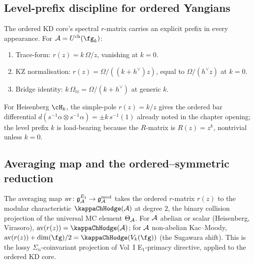 \subsection{Level-prefix discipline for ordered Yangians}
\label{subsec:ordered-kd-core-rmatrix-level-prefix}

\begin{remark}
\label{rem:ordered-kd-core-rmatrix-level-prefix}
The ordered KD core's spectral $r$-matrix carries an explicit
prefix in every appearance. For $\cA = U^{\mathrm{ch}}(\fg_k)$:
\begin{enumerate}[label=\textup{(\roman*)}]
\item Trace-form: $r(z) = k\,\Omega/z$, vanishing at $k=0$.
\item KZ normalisation: $r(z) = \Omega/((k+h^\vee)z)$, equal to
$\Omega/(h^\vee z)$ at $k=0$.
\item Bridge identity: $k\,\Omega_{\mathrm{tr}} = \Omega/(k+h^\vee)$
at generic $k$.
\end{enumerate}
For Heisenberg $\cH_k$, the simple-pole $r(z) = k/z$ gives the
ordered bar differential
$d(s^{-1}\alpha\otimes s^{-1}\alpha) = \pm k\, s^{-1}(1)$
already noted in the chapter opening; the level prefix $k$ is
load-bearing because the $R$-matrix is $R(z) = z^k$, nontrivial
unless $k=0$.
\end{remark}

\subsection{Averaging map and the ordered--symmetric reduction}
\label{subsec:ordered-kd-core-averaging}

\begin{proposition}
\label{prop:ordered-kd-core-averaging-modular}
The averaging map
$\mathrm{av}\colon \mathfrak{g}^{E_1}_{\mathcal{A}} \to
\mathfrak{g}^{\mathrm{mod}}_{\mathcal{A}}$ takes the ordered $r$-matrix
$r(z)$ to the modular characteristic $\kappaChHodge(\cA)$ at degree $2$,
the binary collision projection of the universal MC element
$\Theta_{\mathcal{A}}$. For $\mathcal{A}$ abelian or scalar (Heisenberg, Virasoro),
$\mathrm{av}(r(z)) = \kappaChHodge(\cA)$; for $\mathcal{A}$ non-abelian
Kac--Moody, $\mathrm{av}(r(z)) + \dim(\fg)/2 = \kappaChHodge(V_k(\fg))$
(the Sugawara shift). This is the lossy
$\Sigma_n$-coinvariant projection of Vol~I E$_1$-primacy directive,
applied to the ordered KD core.
\end{proposition}

